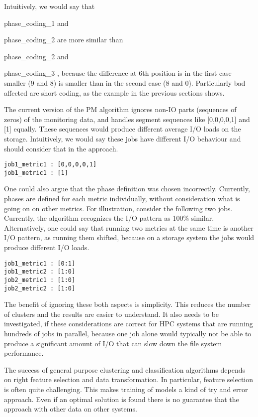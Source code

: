 \documentclass{jhps}
\begin{document}
Intuitively, we would say that {phase\_coding\_1 and{ phase\_coding\_2 are more similar than {phase\_coding\_2 and {phase\_coding\_3 , because the difference at 6th position is in the first case smaller (9 and 8) is smaller than in the second case (8 and 0).
Particularly bad affected are short coding, as the example in the previous sections shows.

The current version of the PM algorithm ignores non-IO parts (sequences of zeros) of the monitoring data, and  handles segment sequences like [0,0,0,0,1] and [1] equally.
These sequences would produce different average I/O loads on the storage.
Intuitively, we would say these jobs have different I/O behaviour and should consider that in the approach.


\begin{lstlisting}
job1_metric1 : [0,0,0,0,1]
job1_metric1 : [1]
\end{lstlisting}

One could also argue that the phase definition was chosen incorrectly.
Currently, phases are defined for each metric individually, without consideration what is going on on other metrics.
For illustration, consider the following two jobs.
Currently, the algorithm recognizes the I/O pattern as 100$\%$  similar.
Alternatively, one could say that running two metrics at the same time is another I/O pattern, as running them shifted, because on a storage system the jobs would produce different I/O loads.

\begin{lstlisting}
job1_metric1 : [0:1]
job1_metric2 : [1:0]
job2_metric1 : [1:0]
job2_metric2 : [1:0]
\end{lstlisting}

The benefit of ignoring these both aspects is simplicity.
This reduces the number of clusters and the results are easier to understand.
It also needs to be investigated, if these considerations are correct for HPC systems that are running hundreds of jobs in parallel, because one job alone would typically not be able to produce a significant amount of I/O that can slow down the file system performance.

The success of general purpose clustering and classification algorithms depends on right feature selection and data transformation.
In particular, feature selection is often quite challenging.
This makes training of models a kind of try and error approach.
Even if an optimal solution is found there is no guarantee that the approach with other data on other systems.

}}}}
\end{document}
